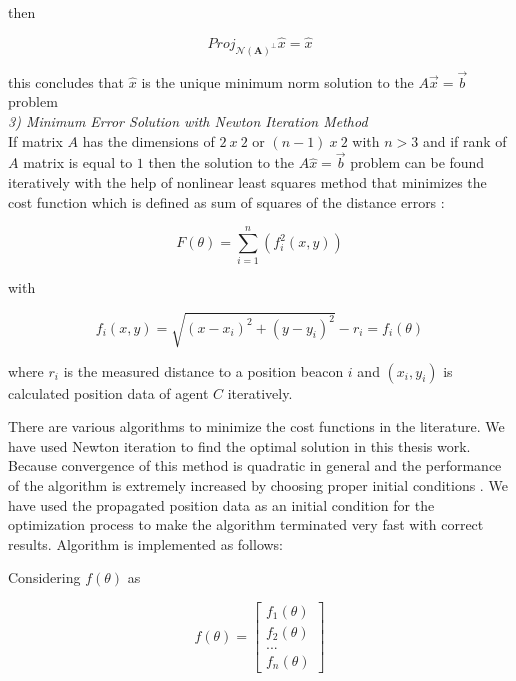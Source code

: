 then 
  
\begin{equation}
Proj_{ \mathcal{N}(\mathbf{A})^\perp}\hat{x} = \hat{x}
\end{equation}
  
this concludes that $\hat{x}$ is the unique minimum norm solution to the $A\vec{x} = \vec{b}$ problem\\
	
	
\textit{3) Minimum Error Solution with Newton Iteration Method}\\	
If matrix $A$ has the dimensions of $2\ x\ 2$ or $(n-1)\ x\ 2$ with $n>3$ and if rank of $A$ matrix is equal to $1$ then the solution to the $A\hat{x} = \vec{b}$ problem can be found iteratively with the help of nonlinear least squares method that minimizes the cost function which is defined as sum of squares of the distance errors \cite{22} :
	
\begin{equation} \label{cost_func_tri}
F(\theta) = \sum_{i=1}^{n} \left(f_i^2(x,y)\right)
\end{equation}
	
with
	
\begin{equation}
f_i(x,y) = \sqrt{(x-x_i)^2 + (y - y_i)^2} - r_i = f_i(\theta) 
\end{equation}

where $r_i$ is the measured distance to a position beacon $i$ and $(x_i, y_i)$ is calculated position data of agent $C$ iteratively.

There are various algorithms to minimize the cost functions in the literature. We have used Newton iteration to find the optimal solution in this thesis work. Because convergence of this method is quadratic in general and the performance of the algorithm is extremely increased by choosing proper initial conditions \cite{wiki_newton}. We have used the propagated position data as an initial condition for the optimization process to make the algorithm terminated very fast with correct results. Algorithm is implemented as follows:

Considering  $f(\theta)$ as

\begin{equation}
f(\theta) = \begin{bmatrix}
f_1(\theta) \\
f_2(\theta) \\
...         \\
f_n(\theta)
\end{bmatrix}
\end{equation}


